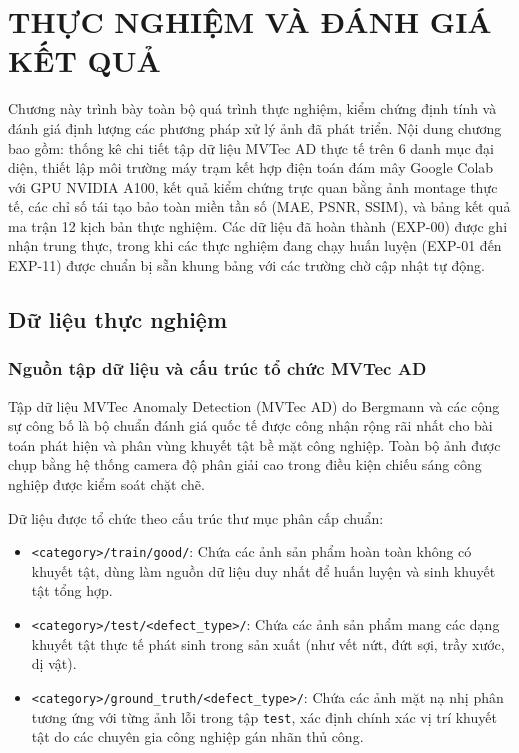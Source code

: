 \chapter{THỰC NGHIỆM VÀ ĐÁNH GIÁ KẾT QUẢ}

Chương này trình bày toàn bộ quá trình thực nghiệm, kiểm chứng định tính và đánh giá định lượng các phương pháp xử lý ảnh đã phát triển. Nội dung chương bao gồm: thống kê chi tiết tập dữ liệu MVTec AD thực tế trên 6 danh mục đại diện, thiết lập môi trường máy trạm kết hợp điện toán đám mây Google Colab với GPU NVIDIA A100, kết quả kiểm chứng trực quan bằng ảnh montage thực tế, các chỉ số tái tạo bảo toàn miền tần số (MAE, PSNR, SSIM), và bảng kết quả ma trận 12 kịch bản thực nghiệm. Các dữ liệu đã hoàn thành (EXP-00) được ghi nhận trung thực, trong khi các thực nghiệm đang chạy huấn luyện (EXP-01 đến EXP-11) được chuẩn bị sẵn khung bảng với các trường chờ cập nhật tự động.

\section{Dữ liệu thực nghiệm}

\subsection{Nguồn tập dữ liệu và cấu trúc tổ chức MVTec AD}

Tập dữ liệu MVTec Anomaly Detection (MVTec AD) do Bergmann và các cộng sự công bố \cite{bergmann2019} là bộ chuẩn đánh giá quốc tế được công nhận rộng rãi nhất cho bài toán phát hiện và phân vùng khuyết tật bề mặt công nghiệp. Toàn bộ ảnh được chụp bằng hệ thống camera độ phân giải cao trong điều kiện chiếu sáng công nghiệp được kiểm soát chặt chẽ.

Dữ liệu được tổ chức theo cấu trúc thư mục phân cấp chuẩn:
\begin{itemize}
    \item \texttt{<category>/train/good/}: Chứa các ảnh sản phẩm hoàn toàn không có khuyết tật, dùng làm nguồn dữ liệu duy nhất để huấn luyện và sinh khuyết tật tổng hợp.
    \item \texttt{<category>/test/<defect\_type>/}: Chứa các ảnh sản phẩm mang các dạng khuyết tật thực tế phát sinh trong sản xuất (như vết nứt, đứt sợi, trầy xước, dị vật).
    \item \texttt{<category>/ground\_truth/<defect\_type>/}: Chứa các ảnh mặt nạ nhị phân tương ứng với từng ảnh lỗi trong tập \texttt{test}, xác định chính xác vị trí khuyết tật do các chuyên gia công nghiệp gán nhãn thủ công.
\end{itemize}


